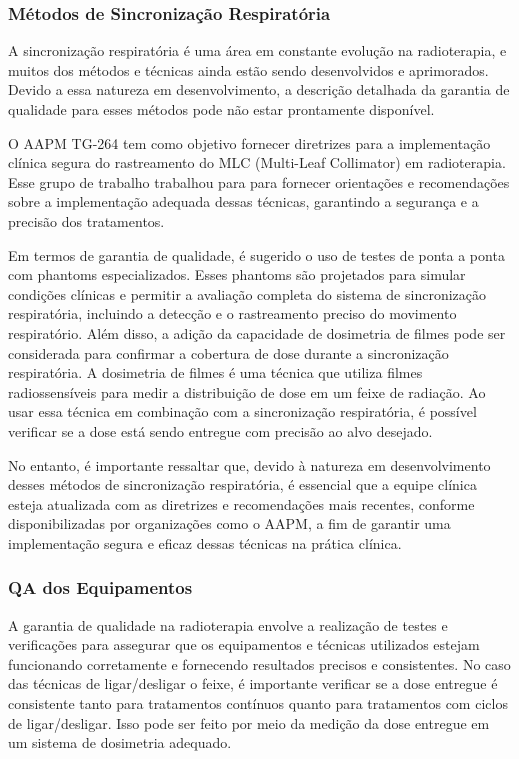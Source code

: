 \documentclass[11pt,a4paper]{article}
\begin{document}
\subsubsection*{Métodos de Sincronização Respiratória}

	A sincronização respiratória é uma área em constante evolução na radioterapia, e muitos dos métodos e técnicas ainda estão sendo desenvolvidos e aprimorados. Devido a essa natureza em desenvolvimento, a descrição detalhada da garantia de qualidade para esses métodos pode não estar prontamente disponível.

	O AAPM TG-264 tem como objetivo fornecer diretrizes para a implementação clínica segura do rastreamento do MLC (Multi-Leaf Collimator) em radioterapia. Esse grupo de trabalho trabalhou para para fornecer orientações e recomendações sobre a implementação adequada dessas técnicas, garantindo a segurança e a precisão dos tratamentos.

	Em termos de garantia de qualidade, é sugerido o uso de testes de ponta a ponta com phantoms especializados. Esses phantoms são projetados para simular condições clínicas e permitir a avaliação completa do sistema de sincronização respiratória, incluindo a detecção e o rastreamento preciso do movimento respiratório. Além disso, a adição da capacidade de dosimetria de filmes pode ser considerada para confirmar a cobertura de dose durante a sincronização respiratória. A dosimetria de filmes é uma técnica que utiliza filmes radiossensíveis para medir a distribuição de dose em um feixe de radiação. Ao usar essa técnica em combinação com a sincronização respiratória, é possível verificar se a dose está sendo entregue com precisão ao alvo desejado.  

	No entanto, é importante ressaltar que, devido à natureza em desenvolvimento desses métodos de sincronização respiratória, é essencial que a equipe clínica esteja atualizada com as diretrizes e recomendações mais recentes, conforme disponibilizadas por organizações como o AAPM, a fim de garantir uma implementação segura e eficaz dessas técnicas na prática clínica.

\subsubsection*{QA dos Equipamentos}

	A garantia de qualidade na radioterapia envolve a realização de testes e verificações para assegurar que os equipamentos e técnicas utilizados estejam funcionando corretamente e fornecendo resultados precisos e consistentes. No caso das técnicas de ligar/desligar o feixe, é importante verificar se a dose entregue é consistente tanto para tratamentos contínuos quanto para tratamentos com ciclos de ligar/desligar. Isso pode ser feito por meio da medição da dose entregue em um sistema de dosimetria adequado.
\end{document}
